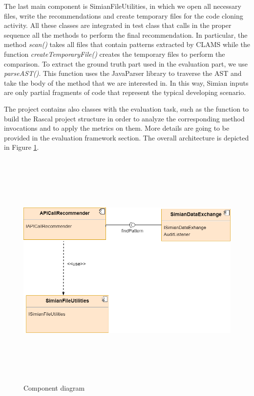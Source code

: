 The last main component is SimianFileUtilities, in which we open all necessary files, write the recommendations and create temporary files for the code cloning activity. All these classes are integrated in test class that calls in the proper sequence all the methods to perform the final recommendation. In particular, the method \textit{scan()} takes all files that contain patterns extracted by CLAMS while the function \textit{createTemporaryFile()} creates the temporary files to perform the comparison. To extract the ground truth part used in the evaluation part, we use \textit{parseAST()}. This function uses the JavaParser library to traverse the AST and take the body of the method that we are interested in. In this way, Simian inputs are only partial fragments of code that represent the typical developing scenario. 

The project contains also classes with the evaluation task, such as the function to build the Rascal project structure in order to analyze the corresponding method invocations and to apply the metrics on them. More details are going to be provided in the evaluation framework section. The overall architecture is depicted in Figure \ref{fig:ComponentDiagram}.

\begin{figure}[!h]
	\includegraphics[width=12cm,height=12cm,keepaspectratio]{images/Component.png}
	\centering
	\caption{Component diagram}
	\label{fig:ComponentDiagram}
\end{figure}








